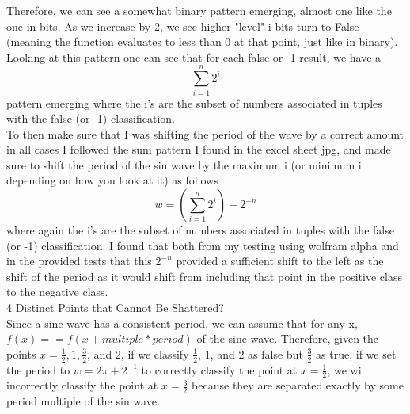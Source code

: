 \documentclass[10pt]{article}
\begin{document}
\noindent
Therefore, we can see a somewhat binary pattern emerging, almost one like the one in bits. As we increase by 2, we see higher "level" i bits turn to False (meaning the function evaluates to less than 0 at that point, just like in binary). Looking at this pattern one can see that for each false or -1 result, we have a $$ \sum\limits_{i=1}^n 2^i $$ pattern emerging where the i's are the subset of numbers associated in tuples with the false (or -1) classification. \\

\noindent
To then make sure that I was shifting the period of the wave by a correct amount in all cases I followed the sum pattern I found in the excel sheet jpg, and made sure to shift the period of the sin wave by the maximum i (or minimum i depending on how you look at it) as follows $$ w = (\sum\limits_{i=1}^n 2^i) + 2^{-n} $$ where again the i's are the subset of numbers associated in tuples with the false (or -1) classification. I found that both from my testing using wolfram alpha and in the provided tests that this $2^{-n}$ provided a sufficient shift to the left as the shift of the period as it would shift from including that point in the positive class to the negative class. \\

\noindent
{\Large 4 Distinct Points that Cannot Be Shattered?}\\

\noindent
Since a sine wave has a consistent period, we can assume that for any x,  $f(x) == f(x + multiple*period)$ of the sine wave. Therefore, given the points $x=\frac{1}{2}, 1, \frac{3}{2}$, and 2, if we classify $\frac{1}{2}$, 1, and 2 as false but $\frac{3}{2}$ as true, if we set the period to $w = 2\pi + 2^{-1}$ to correctly classify the point at $x=\frac{1}{2}$, we will incorrectly classify the point at $x = \frac{3}{2}$ because they are separated exactly by some period multiple of the sin wave.
\end{document}
